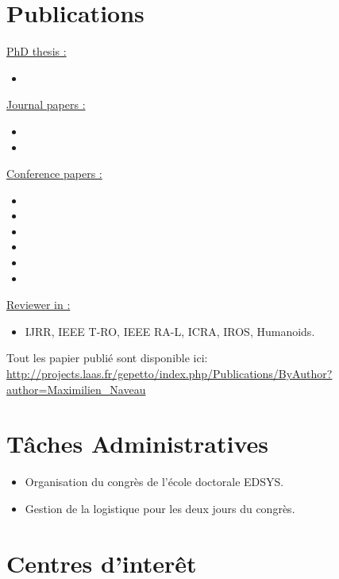 \documentclass[11pt,a4paper]{moderncv}
\newcommand{\items}{\item \hspace{2mm}}
\begin{document}
\section{Publications}

\large{\underline{PhD thesis :}}

\begin{itemize}%
\items {}
\end{itemize}

\large{\underline{Journal papers :}}

\begin{itemize}%
\items {}
\items {}
\end{itemize}%


\large{\underline{Conference papers :}}

\begin{itemize}%
\items {}
\items {}
\items {}
\items {}
\items {}
\items {}
\end{itemize}


\large{\underline{Reviewer in :}}
\begin{itemize}%
\items IJRR, IEEE T-RO, IEEE RA-L, ICRA, IROS, Humanoids.
\end{itemize}

\vspace*{1cm}

Tout les papier publi\'e sont disponible ici:
\url{http://projects.laas.fr/gepetto/index.php/Publications/ByAuthor?author=Maximilien_Naveau}\\

\section{T\^aches Administratives}

{
\begin{itemize}
\items Organisation du congr\`es de l'\'ecole doctorale EDSYS.
\items Gestion de la logistique pour les deux jours du congr\`es.
\end{itemize}
}


\section{Centres d'inter\^et}

\end{document}
